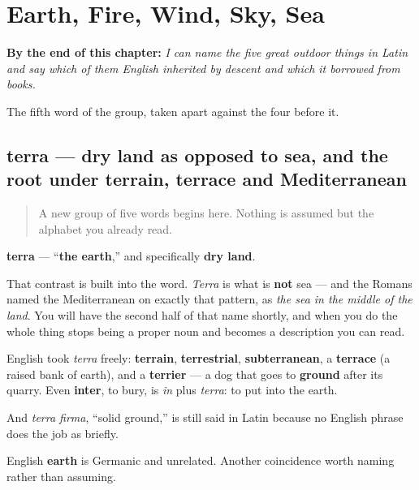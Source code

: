
\chapter{Earth, Fire, Wind, Sky, Sea}
\label{ch:la-mundus}

\begin{chapteropening}
\textbf{By the end of this chapter:} \emph{I can name the five great outdoor things in Latin and say which of them English inherited by descent and which it borrowed from books.}

The fifth word of the group, taken apart against the four before it.
\end{chapteropening}

\section[terra, terrae]{terra — dry land as opposed to sea, and the root under terrain, terrace and Mediterranean}

\label{lesson:LA-C45-terra}



\begin{quote}
A new group of five words begins here. Nothing is assumed but the alphabet you already read.
\end{quote}

\begin{cousinweb}
\textbf{terra} — \textquotedblleft{}\textbf{the earth},\textquotedblright{} and specifically \textbf{dry land}.

That contrast is built into the word. \emph{Terra} is what is \textbf{not} sea — and the Romans named the Mediterranean on exactly that pattern, as \emph{the sea in the middle of the land}. You will have the second half of that name shortly, and when you do the whole thing stops being a proper noun and becomes a description you can read.

English took \emph{terra} freely: \textbf{terrain}, \textbf{terrestrial}, \textbf{subterranean}, a \textbf{terrace} (a raised bank of earth), and a \textbf{terrier} — a dog that goes to \textbf{ground} after its quarry. Even \textbf{inter}, to bury, is \emph{in} plus \emph{terra}: to put into the earth.

And \emph{terra firma}, \textquotedblleft{}solid ground,\textquotedblright{} is still said in Latin because no English phrase does the job as briefly.

English \textbf{earth} is Germanic and unrelated. Another coincidence worth naming rather than assuming.
\end{cousinweb}


